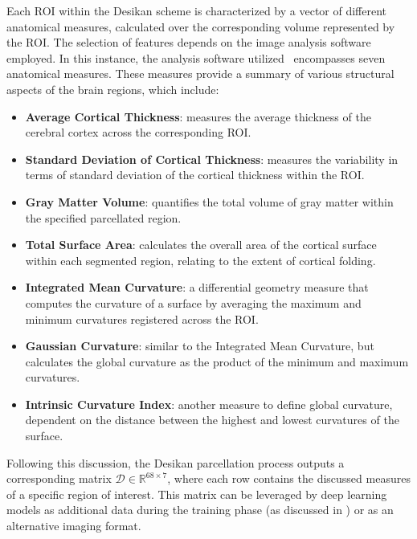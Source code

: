 Each ROI within the Desikan scheme is characterized by a vector of different
anatomical measures, calculated over the corresponding volume represented by the
ROI. The selection of features depends on the image analysis software employed.
In this instance, the analysis software
utilized~ encompasses seven anatomical
measures. These measures provide a summary of various structural aspects of the
brain regions, which include:
\begin{itemize}
    \item \textbf{Average Cortical Thickness}: measures the average thickness of
    the cerebral cortex across the corresponding ROI.
    \item \textbf{Standard Deviation of Cortical Thickness}: measures the
    variability in terms of standard deviation of the cortical thickness within
    the ROI.
    \item \textbf{Gray Matter Volume}: quantifies the total volume of gray
    matter within the specified parcellated region.
    \item \textbf{Total Surface Area}: calculates the overall area of the
    cortical surface within each segmented region, relating to the extent of
    cortical folding.
    \item \textbf{Integrated Mean Curvature}: a differential geometry measure
    that computes the curvature of a surface by averaging the maximum and
    minimum curvatures registered across the ROI.
    \item \textbf{Gaussian Curvature}: similar to the Integrated Mean Curvature,
    but calculates the global curvature as the product of the minimum and
    maximum curvatures.
    \item \textbf{Intrinsic Curvature Index}: another measure to define global
    curvature, dependent on the distance between the highest and lowest
    curvatures of the surface.
\end{itemize}
Following this discussion, the Desikan parcellation process outputs a
corresponding matrix $\mathcal{D} \in \mathbb{R}^{68 \times 7}$, where each row
contains the discussed measures of a specific region of interest. This matrix
can be leveraged by deep learning models as additional data during the training
phase (as discussed in ) or as an alternative imaging format.

